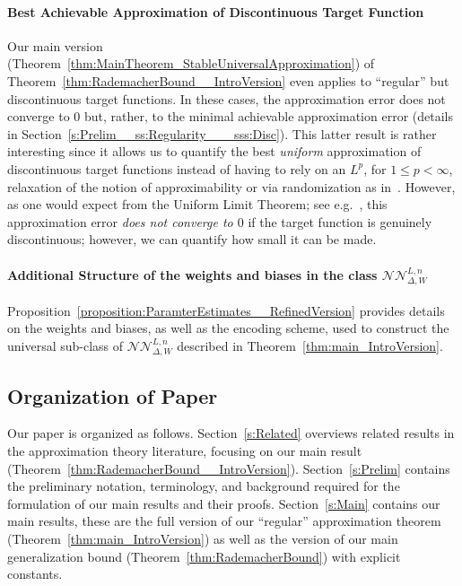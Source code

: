 \documentclass{article}
\numberwithin{equation}{section}
\theoremstyle{definition}
\begin{document}
\paragraph{Best Achievable Approximation of Discontinuous Target Function}
Our main version (Theorem~\ref{thm:MainTheorem_StableUniversalApproximation}) of Theorem~\ref{thm:RademacherBound__IntroVersion} even applies to ``regular'' but discontinuous target functions.  In these cases, the approximation error does not converge to $0$ but, rather, to the minimal achievable approximation error (details in Section~\ref{s:Prelim__ss:Regularity___sss:Disc}).  This latter result is rather interesting since it allows us to quantify the best \textit{uniform} approximation of discontinuous target functions instead of having to rely on an $L^p$, for $1\le p<\infty$, relaxation of the notion of approximability or via randomization as in~\cite{kratsios2022universal}.  However, as one would expect from the Uniform Limit Theorem; see e.g.~\cite[Theorem 21.6]{MunkresTopBook}, this approximation error \textit{does not converge to $0$} if the target function is genuinely discontinuous; however, we can quantify how small it can be made.


\paragraph{{Additional Structure of the weights and biases in the class $\mathcal{NN}_{\Delta,W}^{L,n}$}}
Proposition~\ref{proposition:ParamterEstimates__RefinedVersion} provides details on the weights and biases, as well as the encoding scheme, used to construct the universal sub-class of $\mathcal{NN}_{\Delta,W}^{L,n}$ described in Theorem~\ref{thm:main_IntroVersion}. 

\subsection{Organization of Paper}
\label{s:Intro__ss:Organization}
Our paper is organized as follows.  
Section~\ref{s:Related} overviews related results in the approximation theory literature, focusing on our main result (Theorem~\ref{thm:RademacherBound__IntroVersion}).
Section~\ref{s:Prelim} contains the preliminary notation, terminology, and background required for the formulation of our main results and their proofs.
Section~\ref{s:Main} contains our main results, these are the full version of our ``regular'' approximation theorem (Theorem~\ref{thm:main_IntroVersion}) as well as the version of our main generalization bound (Theorem~\ref{thm:RademacherBound}) with explicit constants.  
\end{document}
